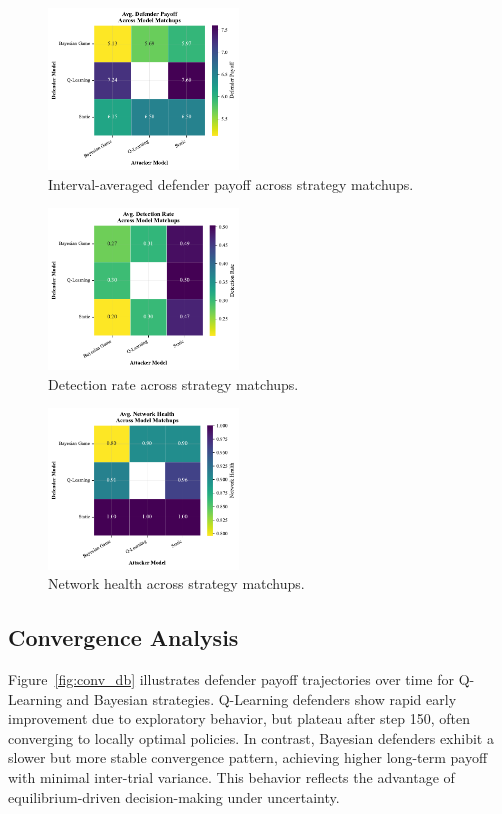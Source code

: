 \documentclass[conference]{IEEEtran}
\begin{document}
\begin{figure}[htbp]
  \centering
  \includegraphics[width=0.45\textwidth]{fig_def_payoff_heatmap.pdf}
  \caption{Interval-averaged defender payoff across strategy matchups.}
  \label{fig:def_payoff_heatmap}
\end{figure}

\begin{figure}[htbp]
  \centering
  \includegraphics[width=0.45\textwidth]{fig_detection_heatmap.pdf}
  \caption{Detection rate across strategy matchups.}
  \label{fig:detection_heatmap}
\end{figure}

\begin{figure}[htbp]
  \centering
  \includegraphics[width=0.45\textwidth]{fig_net_health_heatmap.pdf}
  \caption{Network health across strategy matchups.}
  \label{fig:health_heatmap}
\end{figure}

\subsection{Convergence Analysis}
Figure~\ref{fig:conv_db} illustrates defender payoff trajectories over time for Q-Learning and Bayesian strategies. Q-Learning defenders show rapid early improvement due to exploratory behavior, but plateau after step 150, often converging to locally optimal policies. In contrast, Bayesian defenders exhibit a slower but more stable convergence pattern, achieving higher long-term payoff with minimal inter-trial variance. This behavior reflects the advantage of equilibrium-driven decision-making under uncertainty.
\end{document}
